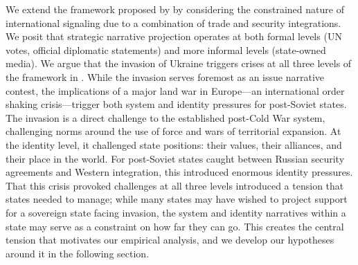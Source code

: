 \documentclass[12pt]{article}
\begin{document}
We extend the framework proposed by \citet{miskimmon_strategic_2013} by considering the constrained nature of international signaling due to a combination of trade and security integrations. We posit that strategic narrative projection operates at both formal levels (UN votes, official diplomatic statements) and more informal levels (state-owned media). We argue that the invasion of Ukraine triggers crises at all three levels of the framework in \citet{miskimmon_strategic_2013}. While the invasion serves foremost as an issue narrative contest, the implications of a major land war in Europe---an international order shaking crisis---trigger both system and identity pressures for post-Soviet states. The invasion is a direct challenge to the established post-Cold War system, challenging norms around the use of force and wars of territorial expansion. At the identity level, it challenged state positions: their values, their alliances, and their place in the world. For post-Soviet states caught between Russian security agreements and Western integration, this introduced enormous identity pressures. That this crisis provoked challenges at all three levels introduced a tension that states needed to manage; while many states may have wished to project support for a sovereign state facing invasion, the system and identity narratives within a state may serve as a constraint on how far they can go. This creates the central tension that motivates our empirical analysis, and we develop our hypotheses around it in the following section.
\end{document}
